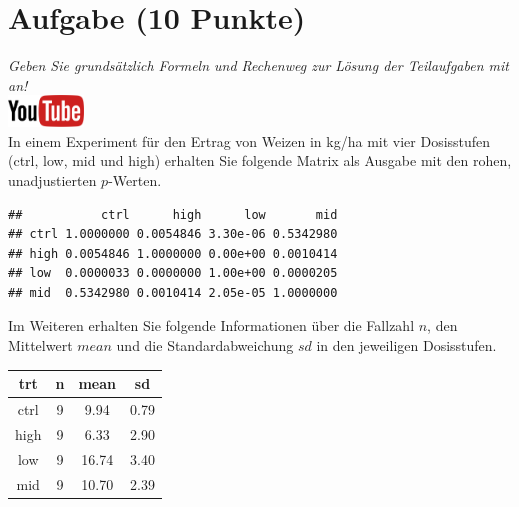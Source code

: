 \documentclass[a4paper, 9pt]{scrartcl}\usepackage[]{graphicx}\usepackage[]{xcolor}
\makeatletter
\newenvironment{kframe}{%
 \def\at@end@of@kframe{}%
 \ifinner\ifhmode%
  \def\at@end@of@kframe{\end{minipage}}%
  \begin{minipage}{\columnwidth}%
 \fi\fi%
 \def\FrameCommand##1{\hskip\@totalleftmargin \hskip-\fboxsep
 \colorbox{shadecolor}{##1}\hskip-\fboxsep
     \hskip-\linewidth \hskip-\@totalleftmargin \hskip\columnwidth}%
 \MakeFramed {\advance\hsize-\width
   \@totalleftmargin\z@ \linewidth\hsize
   \@setminipage}}%
 {\par\unskip\endMakeFramed%
 \at@end@of@kframe}
\newenvironment{knitrout}{}{} %
\makeatother
\begin{document}
 
\clearpage

\section{Aufgabe \hfill (10 Punkte)}

\textit{Geben Sie grunds{\"a}tzlich Formeln und Rechenweg zur L{\"o}sung der
  Teilaufgaben mit an!} \\[1Ex]

 \hfill\href{https://youtu.be/RagTFFKFbFg}{\includegraphics[width =
   2cm]{img/youtube}}\\[1Ex]



 
 In einem Experiment f{\"u}r den Ertrag von Weizen in kg/ha mit vier
 Dosisstufen (ctrl, low, mid und high) erhalten Sie folgende Matrix als
 \Rlogo Ausgabe mit den rohen, unadjustierten $p$-Werten.



\begin{knitrout}
\color{fgcolor}\begin{kframe}
\begin{verbatim}
##           ctrl      high      low       mid
## ctrl 1.0000000 0.0054846 3.30e-06 0.5342980
## high 0.0054846 1.0000000 0.00e+00 0.0010414
## low  0.0000033 0.0000000 1.00e+00 0.0000205
## mid  0.5342980 0.0010414 2.05e-05 1.0000000
\end{verbatim}
\end{kframe}
\end{knitrout}

Im Weiteren erhalten Sie folgende Informationen {\"u}ber die Fallzahl $n$, den
Mittelwert $mean$ und die Standardabweichung $sd$ in den jeweiligen Dosisstufen.

\begin{knitrout}
\color{fgcolor}\begin{table}[!h]
\centering
\begin{tabular}{cccc}
\toprule
trt & n & mean & sd\\
\midrule
ctrl & 9 & 9.94 & 0.79\\
high & 9 & 6.33 & 2.90\\
low & 9 & 16.74 & 3.40\\
mid & 9 & 10.70 & 2.39\\
\bottomrule
\end{tabular}
\end{table}

\end{knitrout}
\end{document}
